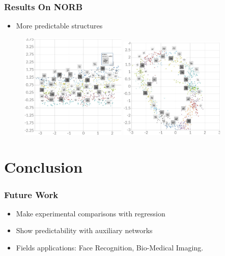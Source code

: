 \documentclass[10pt]{beamer}
\begin{document}
\begin{frame}
    \frametitle{Results On NORB}
    \begin{itemize}
        \item More predictable structures
    \end{itemize}

    \begin{figure}[h]
        \begin{center}
            \includegraphics[width=0.45\textwidth]{../report/thesis_figures/norb_cl2d2.jpg}
            \vspace{1cm}
            \includegraphics[width=0.45\textwidth]{../report/thesis_figures/norb_cl2d.jpg}
        \end{center}
    \end{figure}
\end{frame}


\section{Conclusion}
\begin{frame}
    \frametitle{Future Work}
    \begin{itemize}
        \item Make experimental comparisons with regression
        \item Show predictability with auxiliary networks
        \item Fields applications: Face Recognition, Bio-Medical Imaging.
    \end{itemize}
\end{frame}
\end{document}
